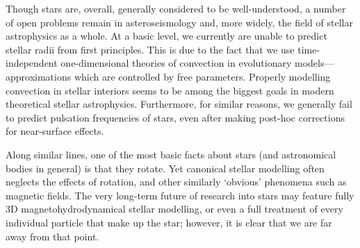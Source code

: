 \label{chap:prospective}

Though stars are, overall, generally considered to be well-understood, a number of open problems remain in asteroseismology and, more widely, the field of stellar astrophysics as a whole. 
At a basic level, we currently are unable to predict stellar radii from first principles. 
This is due to the fact that we use time-independent one-dimensional theories of convection in evolutionary models---approximations which are controlled by free parameters. 
Properly modelling convection in stellar interiors seems to be among the biggest goals in modern theoretical stellar astrophysics. 
Furthermore, for similar reasons, we generally fail to predict pulsation frequencies of stars, even after making post-hoc corrections for near-surface effects. 

Along similar lines, one of the most basic facts about stars (and astronomical bodies in general) is that they rotate. 
Yet canonical stellar modelling often neglects the effects of rotation, and other similarly `obvious' phenomena such as magnetic fields. 
The very long-term future of research into stars may feature fully 3D magnetohydrodynamical stellar modelling, or even a full treatment of every individual particle that make up the star; however, it is clear that we are far away from that point. 

